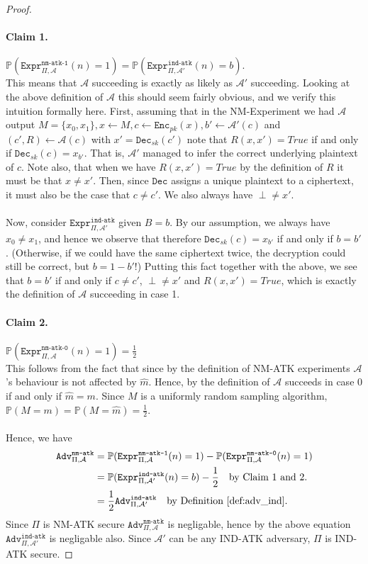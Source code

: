 \documentclass{article}
\theoremstyle{definition}
\newcommand{\Enc}{\texttt{Enc}}
\newcommand{\Dec}{\texttt{Dec}}
\newcommand{\A}{\mathcal{A}}
\newcommand{\Prob}{\mathbb{P}}
\newcommand{\Expr}[2]{\texttt{Expr}^{\texttt{#1}}_{#2}}
\newcommand{\Adv}[2]{\texttt{Adv}^{\texttt{#1}}_{#2}}
\begin{document}
\begin{proof}
  \paragraph{Claim 1.} $\Prob(\Expr{nm-atk-1}{\Pi, \A}(n) = 1) = \Prob(\Expr{ind-atk}{\Pi, \A'}(n) = b)$.\\
  This means that $\A$ succeeding is exactly as likely as $\A'$ succeeding.
  Looking at the above definition of $\A$ this should seem fairly obvious, and
  we verify this intuition formally here. First, assuming that in the
  NM-Experiment we had $\A$ output $M = \{x_0, x_1\}, x \leftarrow M, c
  \leftarrow \Enc_{pk}(x), b' \leftarrow \A'(c)$ and $(c', R) \leftarrow \A(c)$
  with $x' = \Dec_{sk}(c')$ note that
  $R(x, x') = True$ if and only if $\Dec_{sk}(c) = x_{b'}$. That is, $\A'$
  managed to infer the correct underlying plaintext of $c$. Note also, that when
  we have $R(x, x') = True$ by the definition of $R$ it must be that $x \neq
  x'$. Then, since $\Dec$ assigns a unique plaintext to a ciphertext, it must
  also be the case that $c \neq c'$. We also always have $\perp \neq x'$.
  \paragraph{} Now, consider $\Expr{ind-atk}{\Pi, \A'}$ given $B = b$. By our assumption, we
  always have $x_0 \neq x_1$, and hence we observe that therefore $\Dec_{sk}(c) =
  x_{b'}$ if and only if $b = b'$. (Otherwise, if we could have the same
  ciphertext twice, the decryption could still be correct, but $b = 1 - b'$!)
  Putting this fact together with the above, we see that $b = b'$ if and only if
  $c \neq c'$, $\perp \neq x'$ and $R(x, x') = True$, which is exactly the
  definition of $\A$ succeeding in case 1.
  \paragraph{Claim 2.} $\Prob(\Expr{nm-atk-0}{\Pi, \A}(n) = 1) = \frac12$\\
  This follows from the fact that since by the definition of NM-ATK experiments
  $\A$'s behaviour is not affected by $\hat{m}$. Hence, by the definition of
  $\A$ succeeds in case 0 if and only if $\hat{m} = m$. Since $M$ is a uniformly random
  sampling algorithm, $\Prob(M = m) = \Prob(M = \hat{m}) = \frac12$.
  \paragraph{}
  Hence, we have 
  \begin{align*}
    \Adv{nm-atk}{\Pi, \A} &= \Prob(\Expr{nm-atk-1}{\Pi, \A}(n) = 1) - \Prob(\Expr{nm-atk-0}{\Pi, \A}(n) = 1)\\
                          &= \Prob(\Expr{ind-atk}{\Pi, \A'}(n) = b) - \frac12 \quad\text{by Claim 1 and 2.}\\
                          &= \frac12 \Adv{ind-atk}{\Pi, \A'}\quad\text{by Definition \ref{def:adv_ind}}.
  \end{align*}
  Since $\Pi$ is NM-ATK secure $\Adv{nm-atk}{\Pi, \A}$ is negligable, hence by
  the above equation $\Adv{ind-atk}{\Pi, \A'}$ is negligable also. Since $\A'$ can
  be any IND-ATK adversary, $\Pi$ is IND-ATK secure.
\end{proof}
\end{document}
